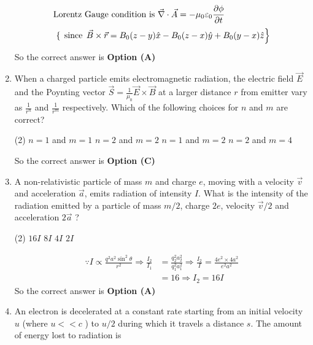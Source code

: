 \begin{enumerate}
\begin{answer}
\begin{align*}
	\text{Lorentz Gauge condition is }\vec{\nabla} \cdot \vec{A}&=-\mu_{0} \varepsilon_{0} \frac{\partial \phi}{\partial t}\\
	\intertext{	$\left\{\right.$ since $\left.\vec{B} \times \vec{r}=B_{0}(z-y) \hat{x}-B_{0}(z-x) \hat{y}+B_{0}(y-x) \hat{z}\right\}$}
	\end{align*}
	So the correct answer is \textbf{Option (A)}
\end{answer}
	\item  When a charged particle emits electromagnetic radiation, the electric field $\vec{E}$ and the Poynting vector $\vec{S}=\frac{1}{\mu_{0}} \vec{E} \times \vec{B}$ at a larger distance $r$ from emitter vary as $\frac{1}{r^{n}}$ and $\frac{1}{r^{m}}$ respectively. Which of the following choices for $n$ and $m$ are correct?
	{}
	\begin{tasks}(2)
		\task[\textbf{a.}]$n=1$ and $m=1$
		\task[\textbf{b.}] $n=2$ and $m=2$
		\task[\textbf{c.}]$n=1$ and $m=2$
		\task[\textbf{d.}] $n=2$ and $m=4$
	\end{tasks}
\begin{answer}
	So the correct answer is \textbf{Option (C)}
\end{answer}
	\item  A non-relativistic particle of mass $m$ and charge $e$, moving with a velocity $\vec{v}$ and acceleration $\vec{a}$, emits radiation of intensity $I$. What is the intensity of the radiation emitted by a particle of mass $m / 2$, charge $2 e$, velocity $\vec{v} / 2$ and acceleration $2 \vec{a}$ ?
	{}
	\begin{tasks}(2)
		\task[\textbf{a.}] $16 I$
		\task[\textbf{b.}]$8 I$
		\task[\textbf{c.}]$4 I$
		\task[\textbf{d.}] $2 I$
	\end{tasks}
\begin{answer}
	\begin{align*}
	\because I \propto \frac{q^{2} a^{2} \sin ^{2} \theta}{r^{2}} \Rightarrow \frac{I_{2}}{I_{1}}&=\frac{q_{2}^{2} a_{2}^{2}}{q_{1}^{2} a_{1}^{2}} \Rightarrow \frac{I_{2}}{I}=\frac{4 e^{2} \times 4 a^{2}}{e^{2} a^{2}}\\&=16 \Rightarrow I_{2}=16 I
	\end{align*}
	So the correct answer is \textbf{Option (A)}
\end{answer}
	\item  An electron is decelerated at a constant rate starting from an initial velocity $u$ (where $u<<c$ ) to $u / 2$ during which it travels a distance $s$. The amount of energy lost to radiation is

\end{enumerate}
